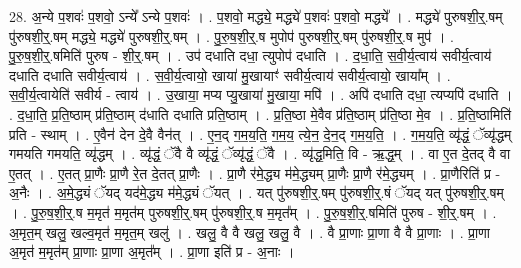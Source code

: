 \documentclass[17pt]{extarticle}
\begin{document}
28. अ॒न्ये प॒शवः॑ प॒शवो॒ ऽन्ये᳚ ऽन्ये प॒शवः॑ । . प॒शवो॒ मद्ध्ये॒ मद्ध्ये॑ प॒शवः॑ प॒शवो॒ मद्ध्ये᳚ । . मद्ध्ये॑ पुरुषशी॒र्॒.षम् पु॑रुषशी॒र्॒.षम् मद्ध्ये॒ मद्ध्ये॑ पुरुषशी॒र्॒.षम् । . पु॒रु॒ष॒शी॒र्॒.ष मुपोप॑ पुरुषशी॒र्॒.षम् पु॑रुषशी॒र्॒.ष मुप॑ । . पु॒रु॒ष॒शी॒र्॒.षमिति॑ पुरुष - शी॒र्॒.षम् । . उप॑ दधाति दधा॒ त्युपोप॑ दधाति । . द॒धा॒ति॒ स॒वी॒र्य॒त्वाय॑ सवीर्य॒त्वाय॑ दधाति दधाति सवीर्य॒त्वाय॑ । . स॒वी॒र्य॒त्वायो॒ खाया॑ मु॒खायाꣳ॑ सवीर्य॒त्वाय॑ सवीर्य॒त्वायो॒ खाया᳚म् । . स॒वी॒र्य॒त्वायेति॑ सवीर्य - त्वाय॑ । . उ॒खाया॒ मप्य प्यु॒खाया॑ मु॒खाया॒ मपि॑ । . अपि॑ दधाति दधा॒ त्यप्यपि॑ दधाति । . द॒धा॒ति॒ प्र॒ति॒ष्ठाम् प्र॑ति॒ष्ठाम् द॑धाति दधाति प्रति॒ष्ठाम् । . प्र॒ति॒ष्ठा मे॒वैव प्र॑ति॒ष्ठाम् प्र॑ति॒ष्ठा मे॒व । . प्र॒ति॒ष्ठामिति॑ प्रति - स्थाम् । . ए॒वैन॑ देन दे॒वै वैन॑त् । . ए॒न॒द् ग॒म॒य॒ति॒ ग॒म॒य॒ त्ये॒न॒ दे॒न॒द् ग॒म॒य॒ति॒ । . ग॒म॒य॒ति॒ व्यृ॑द्धं॒ ॅव्यृ॑द्धम् गमयति गमयति॒ व्यृ॑द्धम् । . व्यृ॑द्धं॒ ॅवै वै व्यृ॑द्धं॒ ॅव्यृ॑द्धं॒ ॅवै । . व्यृ॑द्ध॒मिति॒ वि - ऋ॒द्ध॒म् । . वा ए॒त दे॒तद् वै वा ए॒तत् । . ए॒तत् प्रा॒णैः प्रा॒णै रे॒त दे॒तत् प्रा॒णैः । . प्रा॒णै र॑मे॒द्ध्य म॑मे॒द्ध्यम् प्रा॒णैः प्रा॒णै र॑मे॒द्ध्यम् । . प्रा॒णैरिति॑ प्र - अ॒नैः । . अ॒मे॒द्ध्यं ॅयद् यद॑मे॒द्ध्य म॑मे॒द्ध्यं ॅयत् । . यत् पु॑रुषशी॒र्॒.षम् पु॑रुषशी॒र्॒.षं ॅयद् यत् पु॑रुषशी॒र्॒.षम् । . पु॒रु॒ष॒शी॒र्॒.ष म॒मृत॑ म॒मृत॑म् पुरुषशी॒र्॒.षम् पु॑रुषशी॒र्॒.ष म॒मृत᳚म् । . पु॒रु॒ष॒शी॒र्॒.षमिति॑ पुरुष - शी॒र्॒.षम् । . अ॒मृत॒म् खलु॒ खल्व॒मृत॑ म॒मृत॒म् खलु॑ । . खलु॒ वै वै खलु॒ खलु॒ वै । . वै प्रा॒णाः प्रा॒णा वै वै प्रा॒णाः । . प्रा॒णा अ॒मृत॑ म॒मृत॑म् प्रा॒णाः प्रा॒णा अ॒मृत᳚म् । . प्रा॒णा इति॑ प्र - अ॒नाः । \newline
\end{document}
